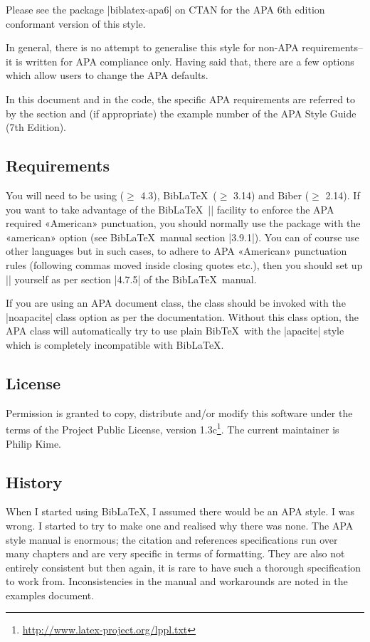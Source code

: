 \documentclass{ltxdockit}
\begin{document}
Please see the package |biblatex-apa6| on CTAN for the APA 6th edition
conformant version of this style.

In general, there is no attempt to generalise this style for non-APA
requirements--it is written for APA compliance only. Having said that,
there are a few options which allow users to change the APA defaults.

In this document and in the code, the specific APA requirements are
referred to by the section and (if appropriate) the example number of the
APA Style Guide (7th Edition).

\subsection{Requirements}\label{ref:req}

You will need to be using  ($\geq$ 4.3), Bib\LaTeX\ ($\geq$
3.14) and Biber ($\geq$ 2.14). If you want to take advantage of the
Bib\LaTeX\ |\DeclareQuotePunctuation| facility to enforce the APA required
«American» punctuation, you should normally use the  package
with the «american» option (see Bib\LaTeX\ manual section |3.9.1|). You can
of course use other languages but in such cases, to adhere to APA
«American» punctuation rules (following commas moved inside closing quotes
etc.), then you should set up |\DeclareQuotePunctuation| yourself as per
section |4.7.5| of the Bib\LaTeX\ manual.

If you are using an APA document \latex class, the class should be invoked
with the |noapacite| class option as per the documentation. Without this
class option, the APA class will automatically try to use plain Bib\TeX\
with the |apacite| style which is completely incompatible with Bib\LaTeX.

\subsection{License}

Permission is granted to copy, distribute and/or modify this software under
the terms of the \latex Project Public License, version
1.3c\footnote{\url{http://www.latex-project.org/lppl.txt}}. The current
maintainer is Philip Kime.

\subsection{History}

When I started using Bib\LaTeX, I assumed there would be an APA style. I
was wrong. I started to try to make one and realised why there was none.
The APA style manual is enormous; the citation and references
specifications run over many chapters and are very specific in terms of
formatting. They are also not entirely consistent but then again, it is
rare to have such a thorough specification to work from. Inconsistencies in
the manual and workarounds are noted in the examples document.
\end{document}
